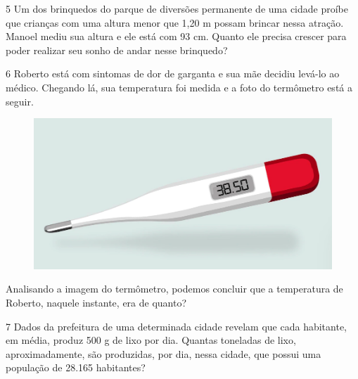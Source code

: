 \bigskip
\num{5} Um dos brinquedos do parque de diversões permanente de uma cidade
proíbe que crianças com uma altura menor que 1,20 m possam brincar nessa
atração. Manoel mediu sua altura e ele está com 93 cm. Quanto ele
precisa crescer para poder realizar seu sonho de andar nesse brinquedo?


\pagebreak
\num{6} Roberto está com sintomas de dor de garganta e sua mãe decidiu levá-lo ao
médico. Chegando lá, sua temperatura foi medida e a foto do termômetro
está a seguir.

\begin{figure}[htpb!]
\centering
\includegraphics[width=\textwidth]{./imgs/mat4.png}
\end{figure}

Analisando a imagem do termômetro, podemos concluir que a temperatura de
Roberto, naquele instante, era de quanto?

\bigskip

\num{7} Dados da prefeitura de uma determinada cidade revelam que cada
habitante, em média, produz 500 g de lixo por dia. Quantas toneladas de lixo,
aproximadamente, são produzidas, por dia, nessa cidade, que
possui uma população de 28.165 habitantes?


